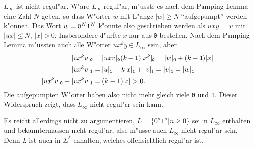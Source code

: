 {\begin{loesung}
\begin{teilaufgaben}
\item $L_\infty$ ist nicht regul"ar. W"are $L_\infty$ regul"ar,
m"usste es nach dem Pumping Lemma eine Zahl $N$ geben, so dass
W"orter $w$ mit L"ange $|w|\ge N$ ``aufgepumpt'' werden k"onnen.
Das Wort $w={\tt 0}^N{\tt 1}^N$ k"onnte also geschrieben werden
als $uxy=w$ mit $|ux|\le N$, $|x|>0$. Insbesondere d"urfte $x$ nur
aus {\tt 0} bestehen. Nach dem Pumping Lemma m"ussten auch alle
W"orter $ux^ky\in L_\infty$ sein, aber
\begin{align*}
|ux^kv|_{\tt 0}
&=
|uxv|_{\tt 0}
(k-1) |x^k|_{\tt 0}
=
|w|_0+(k-1)|x|
\\
|ux^kv|_{\tt 1}
&=
|u|_{\tt 1} + k|x|_{\tt 1} + |v|_{\tt 1}
=
|v|_{\tt 1}
=|w|_{\tt 1}
\\
|ux^kv|_{\tt 0}
-
|ux^kv|_{\tt 1}
&=
(k-1)|x|>0.
\end{align*}
Die aufgepumpten W"orter haben also nicht mehr gleich viele
{\tt 0} und {\tt 1}. Dieser Widerspruch zeigt, dass $L_\infty$
nicht regul"ar sein kann.

Es reicht allerdings nicht zu argumentieren, $L=\{ 0^n1^n|n \ge 0\}$
sei in $L_\infty$ enthalten und bekanntermassen nicht regul"ar,
also m"usse auch $L_\infty$ nicht regul"ar sein. Denn $L$ ist auch
in $\Sigma^*$ enhalten, welches offensichtlich regul"ar ist.
\end{teilaufgaben}
\end{loesung}
}{}


